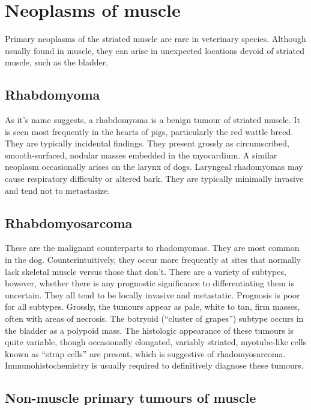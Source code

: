 \documentclass[openany]{report}
\begin{document}
\chapter{Neoplasms of muscle}\label{neoplasms-of-muscle}

Primary neoplasms of the striated muscle are rare in veterinary species.
Although usually found in muscle, they can arise in unexpected locations
devoid of striated muscle, such as the bladder.

\section{Rhabdomyoma}\label{rhabdomyoma}

As it's name suggests, a rhabdomyoma is a benign tumour of striated
muscle. It is seen most frequently in the hearts of pigs, particularly
the red wattle breed. They are typically incidental findings. They
present grossly as circumscribed, smooth-surfaced, nodular masses
embedded in the myocardium. A similar neoplasm occasionally arises on
the larynx of dogs. Laryngeal rhadomyomas may cause respiratory
difficulty or altered bark. They are typically minimally invasive and
tend not to metastasize.

\section{Rhabdomyosarcoma}\label{rhabdomyosarcoma}

These are the malignant counterparts to rhadomyomas. They are most
common in the dog. Counterintuitively, they occur more frequently at
sites that normally lack skeletal muscle versus those that don't. There
are a variety of subtypes, however, whether there is any prognostic
significance to differentiating them is uncertain. They all tend to be
locally invasive and metastatic. Prognosis is poor for all subtypes.
Grossly, the tumours appear as pale, white to tan, firm masses, often
with areas of necrosis. The botryoid (``cluster of grapes'') subtype
occurs in the bladder as a polypoid mass. The histologic appearance of
these tumours is quite variable, though occasionally elongated, variably
striated, myotube-like cells known as ``strap cells'' are present, which
is suggestive of rhadomyosarcoma. Immunohistochemistry is usually
required to definitively diagnose these tumours.

\section{Non-muscle primary tumours of
muscle}\label{non-muscle-primary-tumours-of-muscle}
\end{document}

